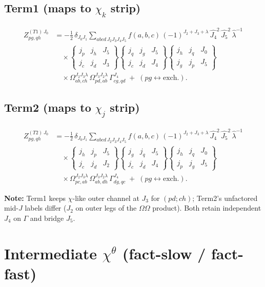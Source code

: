 \documentclass[11pt]{article}
\newcommand{\sixj}[6]{\begin{Bmatrix} #1 & #2 & #3 \\ #4 & #5 & #6 \end{Bmatrix}}
\newcommand{\Jhat}[1]{\widehat{#1}}
\begin{document}
\subsection{Term1 (maps to $\chi_k$ strip)}
\begin{equation}
\begin{aligned}
Z^{(T1)\,J_0}_{pg,qh}
&=-\frac12\,\delta_{J_0J_1}\sum_{abcd\,J_2J_3J_4J_5}
f(a,b,c)\,(-1)^{J_2+J_3+\lambda}\,
\Jhat{J_4}^{2}\,\Jhat{J_5}^{2}\,\hat\lambda^{-1}\\
&\quad\times
\sixj{j_p}{j_h}{J_5}{j_c}{j_d}{J_3}
\sixj{j_q}{j_g}{J_5}{j_c}{j_d}{J_4}
\sixj{j_h}{j_q}{J_0}{j_g}{j_p}{J_5}\\
&\quad\times
\Omega^{J_2J_3\lambda}_{ab,ch}\,
\Omega^{J_3J_2\lambda}_{pd,ab}\,
\Gamma^{J_4}_{cg,qd}
\;+\;(pg\leftrightarrow\text{exch.}).
\end{aligned}
\label{eq:amc-t1}
\end{equation}

\subsection{Term2 (maps to $\chi_j$ strip)}
\begin{equation}
\begin{aligned}
Z^{(T2)\,J_0}_{pg,qh}
&=-\frac12\,\delta_{J_0J_1}\sum_{abcd\,J_2J_3J_4J_5}
f(a,b,c)\,(-1)^{J_2+J_3+\lambda}\,
\Jhat{J_4}^{2}\,\Jhat{J_5}^{2}\,\hat\lambda^{-1}\\
&\quad\times
\sixj{j_h}{j_p}{J_5}{j_c}{j_d}{J_2}
\sixj{j_g}{j_q}{J_5}{j_c}{j_d}{J_4}
\sixj{j_h}{j_q}{J_0}{j_p}{j_g}{J_5}\\
&\quad\times
\Omega^{J_2J_3\lambda}_{pc,ab}\,
\Omega^{J_3J_2\lambda}_{ab,dh}\,
\Gamma^{J_4}_{dg,qc}
\;+\;(pg\leftrightarrow\text{exch.}).
\end{aligned}
\label{eq:amc-t2}
\end{equation}

\textbf{Note:} Term1 keeps $\chi$-like outer channel at $J_3$ for $(pd;ch)$;
Term2's unfactored mid-$J$ labels differ ($J_2$ on outer legs of the $\Omega\Omega$ product).
Both retain independent $J_4$ on $\Gamma$ and bridge $J_5$.

\section{Intermediate $\chi^\theta$ (fact-slow / fact-fast)}
\label{sec:chi}
\end{document}
